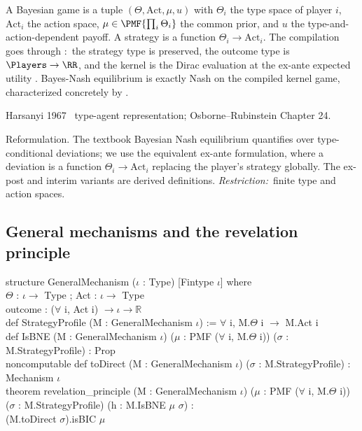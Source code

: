 \Mathematical
A Bayesian game is a tuple
$(\Theta, \mathrm{Act}, \mu, u)$ with $\Theta_i$ the type space of
player $i$, $\mathrm{Act}_i$ the action space, $\mu \in
\PMF{\prod_i \Theta_i}$ the common prior, and $u$ the
type-and-action-dependent payoff.  A strategy is a function
$\Theta_i \to \mathrm{Act}_i$.  The compilation goes through
:\ the strategy type is preserved, the outcome
type is $\Players \to \RR$, and the kernel is the Dirac evaluation
at the ex-ante expected utility .  Bayes-Nash
equilibrium is exactly Nash on the compiled kernel game,
characterized concretely by .

\Textbook
Harsanyi 1967~\citep{Harsanyi1967} type-agent representation;
Osborne–Rubinstein Chapter 24.

\Faithfulness
Reformulation.  The textbook Bayesian Nash equilibrium quantifies
over type-conditional deviations; we use the equivalent ex-ante
formulation, where a deviation is a function $\Theta_i \to
\mathrm{Act}_i$ replacing the player's strategy globally.  The
ex-post and interim variants are derived definitions.
\emph{Restriction:}\ finite type and action spaces.

\subsection{General mechanisms and the revelation principle}
\label{sec:supp:revelation}\label{def:GeneralMechanism}\label{def:revelation_principle}

\begin{leanbox}
structure GeneralMechanism ($\iota$ : Type) [Fintype $\iota$] where\\
\bd $\Theta$       : $\iota \to$ Type ; Act : $\iota \to$ Type\\
\bd outcome : ($\forall$ i, Act i) $\to \iota \to \mathbb{R}$\\[3pt]
def StrategyProfile (M : GeneralMechanism $\iota$) := $\forall$ i, M.$\Theta$ i $\to$ M.Act i\\[3pt]
def IsBNE (M : GeneralMechanism $\iota$) ($\mu$ : PMF ($\forall$ i, M.$\Theta$ i)) ($\sigma$ : M.StrategyProfile) : Prop\\[3pt]
noncomputable def toDirect (M : GeneralMechanism $\iota$) ($\sigma$ : M.StrategyProfile) : Mechanism $\iota$\\[3pt]
theorem revelation\_principle (M : GeneralMechanism $\iota$) ($\mu$ : PMF ($\forall$ i, M.$\Theta$ i))\\
\bd ($\sigma$ : M.StrategyProfile) (h : M.IsBNE $\mu$ $\sigma$) :\\
\bd (M.toDirect $\sigma$).isBIC $\mu$
\end{leanbox}

